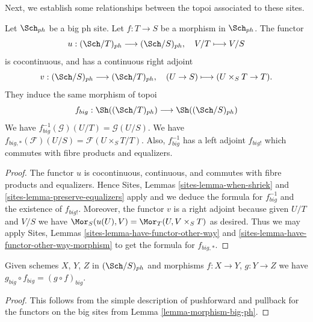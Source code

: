 \noindent
Next, we establish some relationships between the topoi
associated to these sites.

\begin{lemma}
\label{lemma-morphism-big-ph}
Let $\Sch_{ph}$ be a big ph site.
Let $f : T \to S$ be a morphism in $\Sch_{ph}$.
The functor
$$
u : (\Sch/T)_{ph} \longrightarrow (\Sch/S)_{ph},
\quad
V/T \longmapsto V/S
$$
is cocontinuous, and has a continuous right adjoint
$$
v : (\Sch/S)_{ph} \longrightarrow (\Sch/T)_{ph},
\quad
(U \to S) \longmapsto (U \times_S T \to T).
$$
They induce the same morphism of topoi
$$
f_{big} :
\Sh((\Sch/T)_{ph})
\longrightarrow
\Sh((\Sch/S)_{ph})
$$
We have $f_{big}^{-1}(\mathcal{G})(U/T) = \mathcal{G}(U/S)$.
We have $f_{big, *}(\mathcal{F})(U/S) = \mathcal{F}(U \times_S T/T)$.
Also, $f_{big}^{-1}$ has a left adjoint $f_{big!}$ which commutes with
fibre products and equalizers.
\end{lemma}

\begin{proof}
The functor $u$ is cocontinuous, continuous, and commutes with fibre products
and equalizers. Hence
Sites, Lemmas \ref{sites-lemma-when-shriek} and
\ref{sites-lemma-preserve-equalizers}
apply and we deduce the formula
for $f_{big}^{-1}$ and the existence of $f_{big!}$. Moreover,
the functor $v$ is a right adjoint because given $U/T$ and $V/S$
we have $\Mor_S(u(U), V) = \Mor_T(U, V \times_S T)$
as desired. Thus we may apply
Sites, Lemmas \ref{sites-lemma-have-functor-other-way} and
\ref{sites-lemma-have-functor-other-way-morphism} to get the
formula for $f_{big, *}$.
\end{proof}

\begin{lemma}
\label{lemma-composition-ph}
Given schemes $X$, $Y$, $Z$ in $(\Sch/S)_{ph}$
and morphisms $f : X \to Y$, $g : Y \to Z$ we have
$g_{big} \circ f_{big} = (g \circ f)_{big}$.
\end{lemma}

\begin{proof}
This follows from the simple description of pushforward
and pullback for the functors on the big sites from
Lemma \ref{lemma-morphism-big-ph}.
\end{proof}



































